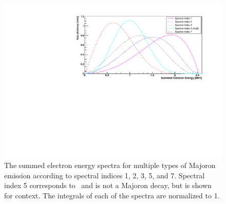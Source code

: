 \begin{figure}[htbp]
    \centering
    \includegraphics[width=0.9\linewidth]{Figures/EnergySpectrum_fixedFermi.pdf}
    \caption[The summed electron energy spectra for multiple types of Majoron emission according to spectral indices 1, 2, 3, 5, and 7]
    {The summed electron energy spectra for multiple types of Majoron emission according to spectral indices 1, 2, 3, 5, and 7.
    Spectral index 5 corresponds to \twonubb~and is not a Majoron decay, but is shown for context.
    The integrals of each of the spectra are normalized to 1.}
    \label{fig:Majoron Spectrum}
\end{figure}


